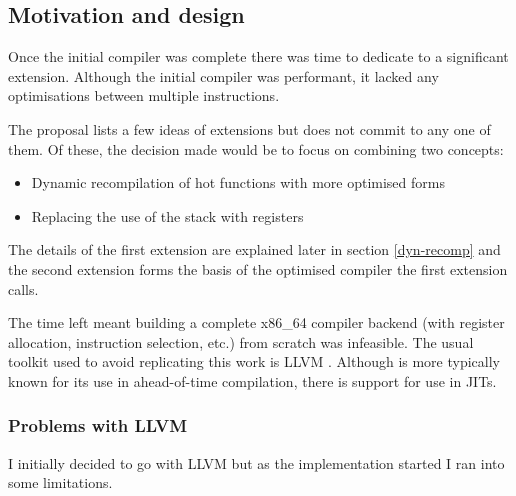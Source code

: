 \subsection{Motivation and design}

Once the initial compiler was complete there was time to dedicate to a significant extension.
Although the initial compiler was performant, it lacked any optimisations between multiple
instructions.

The proposal lists a few ideas of extensions but does not commit to any one of them. Of these, the
decision made would be to focus on combining two concepts:

\begin{itemize}
      \item Dynamic recompilation of hot functions with more optimised forms
      \item Replacing the use of the stack with registers
\end{itemize}

The details of the first extension are explained later in section \ref{dyn-recomp} and the second
extension forms the basis of the optimised compiler the first extension calls.

The time left meant building a complete x86\_64 compiler backend (with register allocation,
instruction selection, etc.) from scratch was infeasible. The usual toolkit used to avoid
replicating this work is LLVM \cite{llvm}. Although is more typically known for its use in
ahead-of-time compilation, there is support for use in JITs.

\subsubsection{Problems with LLVM}

I initially decided to go with LLVM but as the implementation started I ran into some limitations.

